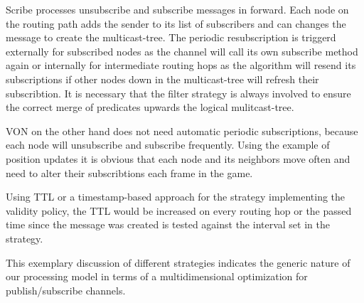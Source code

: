 Scribe processes unsubscribe and subscribe messages in forward. Each node on the routing path adds the sender to its list of subscribers and can changes the message to create the multicast-tree. The periodic resubscription is triggerd externally for subscribed nodes as the channel will call its own subscribe method again or internally for intermediate routing hops as the algorithm will resend its subscriptions if other nodes down in the multicast-tree will refresh their subscribtion. It is necessary that the filter strategy is always involved to ensure the correct merge of predicates upwards the logical mulitcast-tree.

VON on the other hand does not need automatic periodic subscriptions, because each node will unsubscribe and subscribe frequently. Using the example of position updates it is obvious that each node and its neighbors move often and need to alter their subscribtions each frame in the game.

Using TTL or a timestamp-based approach for the strategy implementing the validity policy, the TTL would be increased on every routing hop or the passed time since the message was created is tested against the interval set in the strategy.

This exemplary discussion of different strategies indicates the generic nature of our processing model in terms of a multidimensional optimization for publish/subscribe channels.
